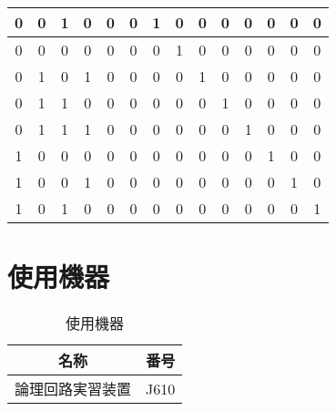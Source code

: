 \documentclass[dvipdfmx,a4paper]{jsarticle}
\begin{document}
\begin{enumerate}
\begin{itemize}
\begin{table}[H]
\begin{tabular}{|c|c|c|c|c|c|c|c|c|c|c|c|c|c|}
										0 &     0 &     1 &     0 & 0 & 0 & 1 & 0 & 0 & 0 & 0 & 0 & 0 & 0 \\ \hline
										0 &     0 &     0 &     0 & 0 & 0 & 0 & 1 & 0 & 0 & 0 & 0 & 0 & 0 \\ \hline
										0 &     1 &     0 &     1 & 0 & 0 & 0 & 0 & 1 & 0 & 0 & 0 & 0 & 0 \\ \hline
										0 &     1 &     1 &     0 & 0 & 0 & 0 & 0 & 0 & 1 & 0 & 0 & 0 & 0 \\ \hline
										0 &     1 &     1 &     1 & 0 & 0 & 0 & 0 & 0 & 0 & 1 & 0 & 0 & 0 \\ \hline
										1 &     0 &     0 &     0 & 0 & 0 & 0 & 0 & 0 & 0 & 0 & 1 & 0 & 0 \\ \hline
										1 &     0 &     0 &     1 & 0 & 0 & 0 & 0 & 0 & 0 & 0 & 0 & 1 & 0 \\ \hline
										1 &     0 &     1 &     0 & 0 & 0 & 0 & 0 & 0 & 0 & 0 & 0 & 0 & 1 \\ \hline
								\end{tabular}
							\end{table}
					\end{itemize}
				\end{enumerate}
	\section{使用機器}
		\begin{table}[H]
			\center
			\caption{使用機器}
			\begin{tabular}{|c|c|}
				\hline
				名称 & 番号\\ \hline
				論理回路実習装置 & J610 \\ \hline
			\end{tabular}
		\end{table}
\end{document}
